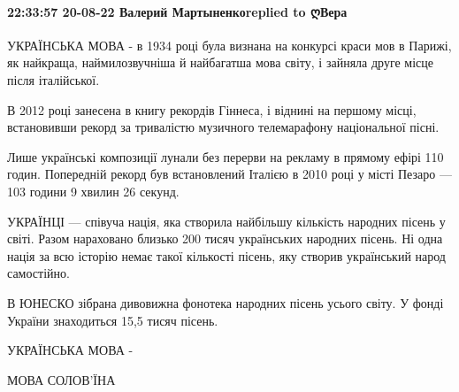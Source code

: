  
 
 
 
 

\paragraph{22:33:57 20-08-22 Валерий Мартыненкоreplied to ღВера}

УКРАЇНСЬКА МОВА - в 1934 році була визнана на конкурсі краси мов в Парижі, як найкраща, наймилозвучніша й найбагатша мова світу, і зайняла друге місце після італійської.

В 2012 році занесена в книгу рекордів Гіннеса, і віднині на першому місці, встановивши рекорд за тривалістю музичного телемарафону національної пісні.

Лише українські композиції лунали без перерви на рекламу в прямому ефірі 110 годин. Попередній рекорд був встановлений Італією в 2010 році у місті Пезаро — 103 години 9 хвилин 26 секунд.

УКРАЇНЦІ — співуча нація, яка створила найбільшу кількість народних пісень у світі. Разом нараховано близько 200 тисяч українських народних пісень. Ні одна нація за всю історію немає такої кількості пісень, яку створив український народ самостійно.

В ЮНЕСКО зібрана дивовижна фонотека народних пісень усього світу. У фонді України знаходиться 15,5 тисяч пісень.

УКРАЇНСЬКА МОВА -

МОВА СОЛОВ’ЇНА
